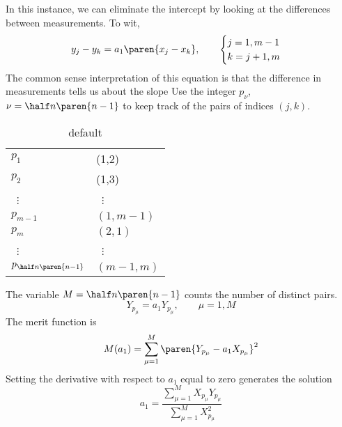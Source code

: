 In this instance, we can eliminate the intercept by looking at the differences between measurements. To wit,
  \begin{equation*}   %
      y_{j} - y_{k} = a_{1} \paren{x_{j} - x_{k}}, \qquad \begin{cases}j=1, m-1\\ k= j+1, m\end{cases}
   \label{eq:difference jk}
  \end{equation*}
The common sense interpretation of this equation is that the difference in measurements tells us about the slope
Use the integer $p_{\nu}$, $\nu=\half n\paren{n-1}$ to keep track of the pairs of indices $(j,k)$. 
\begin{table}[htbp]
    \caption{default}
    \begin{center}
        \begin{tabular}{ll}
			$p_{1}$ & (1,2) \\
			$p_{2}$ & (1,3) \\
			\ $\vdots$ & \ $\vdots$ \\
			$p_{m-1}$ & $(1,m-1)$  \\
			$p_{m}$ & $(2,1)$  \\
			\ $\vdots$ & \ $\vdots$ \\
			$p_{\half n\paren{n-1}}$ & $(m-1,m)$  \\
        \end{tabular}
    \end{center}
    \label{default}
\end{table}
The variable $M  = \half n\paren{n-1}$ counts the number of distinct pairs.
  \begin{equation*}   %
      Y_{p_{\mu}} = a_{1} Y_{p_{\mu}}, \qquad \mu = 1, M
   \label{eq:difference jk}
  \end{equation*}
The merit function is
  \begin{equation*}   %
      M(a_{1}) = \sum_{\mu=1}^{M} \paren{Y_{p_{\mu}} - a_{1} X_{p_{\mu}}}^{2}
  \end{equation*}
Setting the derivative with respect to $a_{1}$ equal to zero generates the solution
  \begin{equation*}   %
      a_{1} = \frac{\sum_{\mu=1}^{M} X_{p_{\mu}} Y_{p_{\mu}}} {\sum_{\mu=1}^{M} X_{p_{\mu}}^{2}}
  \end{equation*}

